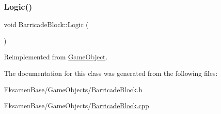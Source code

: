 \mbox{\label{class_barricade_block_ac01d18a8afea6f0b15c7ec7b0167c7f1}} 
\subsubsection{\texorpdfstring{Logic()}{Logic()}}
{\footnotesize\ttfamily void Barricade\+Block\+::\+Logic (\begin{DoxyParamCaption}{ }\end{DoxyParamCaption})\hspace{0.3cm}{\ttfamily [virtual]}}



Reimplemented from \mbox{\hyperlink{class_game_object_a79510ffc77339fe850491dce9f580fa9}{Game\+Object}}.



The documentation for this class was generated from the following files\+:\begin{DoxyCompactItemize}
\item 
Eksamen\+Base/\+Game\+Objects/\mbox{\hyperlink{_barricade_block_8h}{Barricade\+Block.\+h}}\item 
Eksamen\+Base/\+Game\+Objects/\mbox{\hyperlink{_barricade_block_8cpp}{Barricade\+Block.\+cpp}}\end{DoxyCompactItemize}
